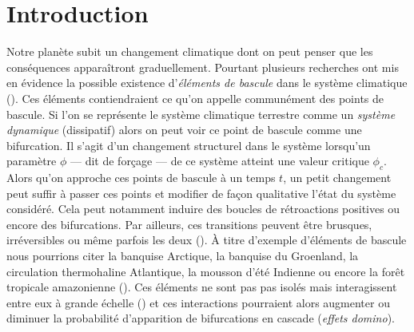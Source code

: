 \section{Introduction}

Notre planète subit un changement climatique dont on peut penser que les conséquences apparaîtront graduellement. Pourtant plusieurs recherches ont mis en évidence la possible existence d'\emph{éléments de bascule} dans le système climatique (\cite{lenton_tipping_2008}). Ces éléments contiendraient ce qu'on appelle communément des points de bascule. Si l'on se représente le système climatique terrestre comme un \emph{système dynamique} (dissipatif) alors on peut voir ce point de bascule comme une bifurcation. Il s'agit d'un changement structurel dans le système lorsqu'un paramètre $\phi$ --- dit de forçage --- de ce système atteint une valeur critique $\phi_c$. Alors qu'on approche ces points de bascule à un temps $t$, un petit changement peut suffir à passer ces points et modifier de façon qualitative l'état du système considéré. Cela peut notamment induire des boucles de rétroactions positives ou encore des bifurcations. Par ailleurs, ces transitions peuvent être brusques, irréversibles ou même parfois les deux (\cite{Lenton_2012}). À titre d'exemple d'éléments de bascule nous pourrions citer la banquise Arctique, la banquise du Groenland, la circulation thermohaline Atlantique, la mousson d'été Indienne ou encore la forêt tropicale amazonienne (\cite{lenton_tipping_2008, thompson_predicting_2011}). Ces éléments ne sont pas pas isolés mais interagissent entre eux à grande échelle (\cite{lenton_climate_2019_too_risky}) et ces interactions pourraient alors augmenter ou diminuer la probabilité d'apparition de bifurcations en cascade (\emph{effets domino}).

